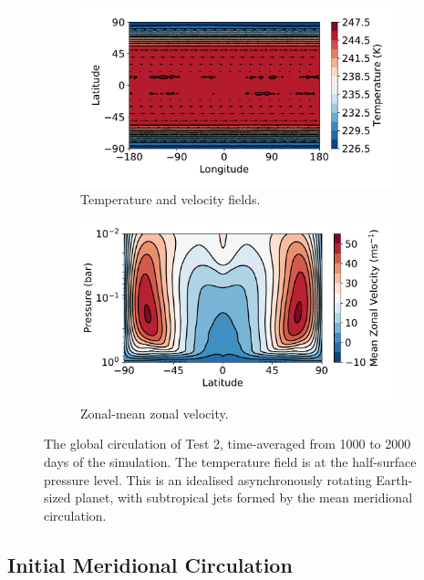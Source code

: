 \begin{figure}
  \centering
  \begin{subfigure}[t]{0.48\textwidth}
    \includegraphics[width=1.0\textwidth]{figures/eqm-zonal-flow/default-gcm-axi-temp.pdf}
    \caption{Temperature and velocity fields.}\label{fig:default-gcm-axi-temp}
  \end{subfigure}
\quad
  \begin{subfigure}[t]{0.48\textwidth}
    \includegraphics[width=1.0\textwidth]{figures/eqm-zonal-flow/default-gcm-axi-zonal-flow.pdf}
    \caption{Zonal-mean zonal velocity.}\label{default-gcm-axi-zonal-flow}
  \end{subfigure}
  \caption{The global circulation of Test 2, time-averaged from 1000 to 2000 days of the simulation. The temperature field is at the half-surface pressure level. This is an idealised asynchronously rotating Earth-sized planet, with subtropical jets formed by the mean meridional circulation.}\label{fig:default-gcm-axi-example}
\end{figure}


\subsection{Initial Meridional Circulation}

